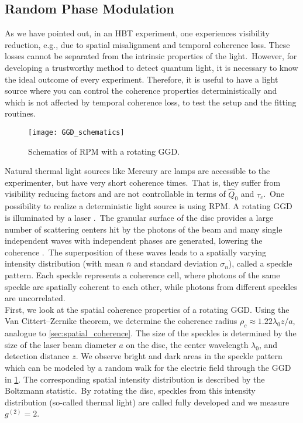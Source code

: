 \subsection{Random Phase Modulation}\label{sec:rpm}
As we have pointed out, in an \ac{HBT} experiment, one experiences visibility reduction, e.g., due to spatial misalignment and temporal coherence loss. These losses cannot be separated from the intrinsic properties of the light.~However, for developing a trustworthy method to detect quantum light, it is necessary to know the ideal outcome of every experiment. Therefore, it is useful to have a light source where you can control the coherence properties deterministically and which is not affected by temporal coherence loss, to test the setup and the fitting routines. 
\begin{figure}[h!]
	\centering
	\texttt{[image: GGD\_schematics]}
	\caption{Schematics of \ac{RPM} with a rotating \ac{GGD}.}
	\label{fig:GGD_schematics}
\end{figure}
\noindent Natural thermal light sources like Mercury arc lamps are accessible to the experimenter, but have very short coherence times.~That is, they suffer from visibility reducing factors and are not controllable in terms of $\hat{Q}_0$ and $\tau_c$.~One possibility to realize a deterministic light source is using \ac{RPM}. A rotating \ac{GGD} is illuminated by a laser \cite{huang_measuring_2016}.~The granular surface of the disc provides a large number of scattering centers hit by the photons of the beam and many single independent waves with independent phases are generated, lowering the coherence \cite{asakura_spatial_1970}.~The superposition of these waves leads to a spatially varying intensity distribution (with mean $\bar{n}$ and standard deviation $\sigma_n$), called a speckle pattern. Each speckle represents a coherence cell, where photons of the same speckle are spatially coherent to each other, while photons from different speckles are uncorrelated.\\
First, we look at the spatial coherence properties of a rotating \ac{GGD}. Using the Van Cittert--Zernike theorem, we determine the coherence radius $\rho_c\approx 1.22 \lambda_0 z/a$, analogue to \cref{sec:spatial_coherence}. The size of the speckles is determined by the size of the laser beam diameter $a$ on the disc, the center wavelength $\lambda_0$, and detection distance $z$. We observe bright and dark areas in the speckle pattern which can be modeled by a random walk \cite{goodman_fundamental_1976} for the electric field through the \ac{GGD} in \cref{fig:GGD_schematics}. The corresponding spatial intensity distribution is described by the Boltzmann statistic.~By rotating the disc, speckles from this intensity distribution (so-called thermal light) are called fully developed \cite{halpaap_experimental_2020} and we measure $g^{(2)}=2$.\\
